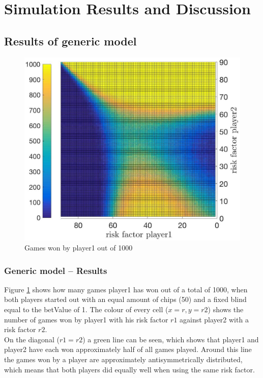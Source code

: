 \documentclass[11pt]{article}
\begin{document}
\section{Simulation Results and Discussion}

\subsection{Results of generic model}

\begin{figure}
\begin{center}
\includegraphics[scale=0.2]{Graphics/allDataPlot_BlindOn_1000Games_001Step_TopFlat.jpg}
\caption{Games won by player1 out of 1000\label{Topview of all Data}}
\end{center}
\end{figure}

\subsubsection{Generic model -- Results }
Figure \ref{Topview of all Data} shows how many games player1 has won out of a total of 1000, when both players started out with an equal amount of chips (50) and a fixed blind equal to the betValue of 1. The colour of every cell ($x=r, y=r2$) shows the number of games won by player1 with his risk factor $r1$ against player2 with a risk factor $r2$.\\
% 

On the diagonal ($r1=r2$) a green line can be seen, which shows that player1 and player2 have each won approximately half of all games played. Around this line the games won by a player are approximately antisymmetrically distributed, which means that both players did equally well when using the same risk factor.\\
\end{document}
